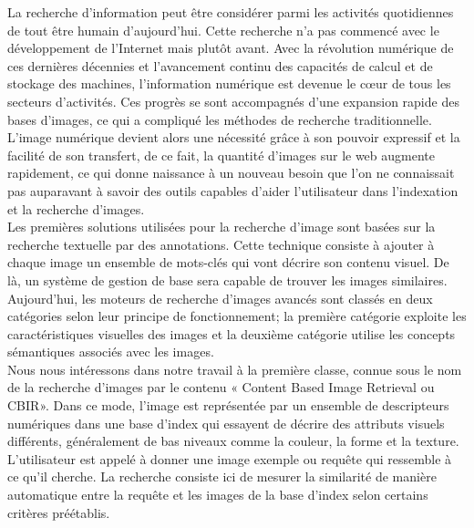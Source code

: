 \begin{center}
\end{center}

La recherche d'information peut être considérer parmi les activités quotidiennes de tout être humain d'aujourd'hui. Cette recherche n'a pas commencé avec le développement de l’Internet mais plutôt avant. Avec la révolution numérique de ces dernières décennies et l’avancement continu des capacités de calcul et de stockage des machines, l’information numérique est devenue le cœur de tous les secteurs d’activités. Ces progrès se sont accompagnés d’une expansion rapide des bases d'images, ce qui a compliqué les méthodes de recherche traditionnelle.\\

L'image numérique devient alors une nécessité grâce à son pouvoir expressif et la facilité de son transfert, de ce fait, la quantité d'images sur le web augmente rapidement, ce qui donne naissance à un nouveau besoin que l’on ne connaissait pas auparavant à savoir des outils capables d’aider l’utilisateur dans l’indexation et la recherche d’images.\\

Les premières solutions utilisées pour la recherche d’image sont basées sur la recherche textuelle par des annotations. Cette technique consiste à ajouter à chaque image un ensemble de mots-clés qui vont décrire son contenu visuel. De là, un système de gestion de base sera capable de trouver les images similaires.\\

Aujourd’hui, les moteurs de recherche d’images avancés sont classés en deux catégories selon leur principe de fonctionnement; la première catégorie exploite les caractéristiques visuelles des images et la deuxième catégorie utilise les concepts sémantiques associés avec les images.\\

Nous nous intéressons dans notre travail à la première classe, connue sous le nom de la recherche d’images par le contenu « Content Based Image Retrieval ou CBIR».
Dans ce mode, l’image est représentée par un ensemble de descripteurs
numériques dans une base d'index qui essayent de décrire des attributs visuels différents, généralement de bas niveaux comme la couleur, la forme et la texture. L’utilisateur est appelé à donner une image exemple ou requête qui ressemble à ce qu’il cherche. La recherche consiste ici de mesurer la similarité de manière automatique entre la requête et les images de la base d'index selon certains critères préétablis.\\

